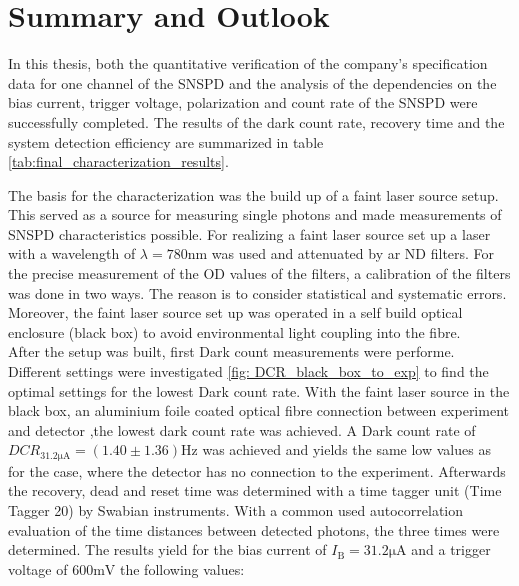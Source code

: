 
\chapter{Summary and Outlook}
\label{sec:Summary_and_Outlook}

In this thesis, both the quantitative verification of the company's specification data for one channel of the SNSPD
and the analysis of the dependencies on the bias current, trigger voltage, polarization and count rate of the SNSPD
were successfully completed.
The results of the dark count rate, recovery time and the system detection efficiency are summarized in table \ref{tab:final_characterization_results}.

The basis for the characterization was the build up of a faint laser source setup.
This served as a source for measuring single photons and made measurements of SNSPD
characteristics possible.
For realizing a faint laser source set up a laser with a wavelength of $\lambda = 780\si{\nano \m}$ was used and
attenuated by ar ND filters.
For the precise measurement of the OD values of the filters, a calibration of the filters was done in two ways.
The reason is to consider statistical and systematic errors.
Moreover, the faint laser source set up was operated in a self build optical enclosure (black box) to avoid
environmental light coupling into the fibre.\\

After the setup was built, first Dark count measurements were performe.
Different settings were investigated \ref{fig: DCR_black_box_to_exp} to find the optimal settings for the lowest Dark count rate.
With the faint laser source in the black box, an aluminium foile coated optical fibre connection between experiment and detector
,the lowest dark count rate was achieved.
A Dark count rate of $DCR_{31.2\si{\micro \A}} = (1.40 \pm 1.36) \si{\Hz}$ was achieved and yields the same low values as for
the case, where the detector has no connection to the experiment.
Afterwards the recovery, dead and reset time was determined with a time tagger unit (Time Tagger 20) by Swabian instruments.
With a common used autocorrelation evaluation \cite{autebert-2020,miki-2017} of the time distances between detected photons,
the three times were determined.
The results yield for the bias current of $I_{\text{B}} = 31.2\si{\micro \A}$ and
a trigger voltage of 600$\si{\milli \V}$ the following values:

